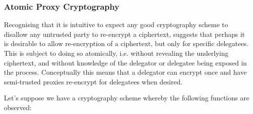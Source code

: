

\subsubsection{Atomic Proxy Cryptography}

Recognising that it is intuitive to expect any good cryptography scheme to disallow any untrusted party to re-encrypt a ciphertext, \cite{bbs:1998:book} suggests that perhaps it is desirable to allow re-encryption of a ciphertext, but only for specific delegatees. This is subject to doing so atomically, i.e. without revealing the underlying ciphertext, and without knowledge of the delegator or delegatee being exposed in the process. Conceptually this means that a delegator can encrypt once and have semi-trusted proxies re-encrypt for delegatees when desired.

Let's suppose we have a cryptography scheme whereby the following functions are observed:

